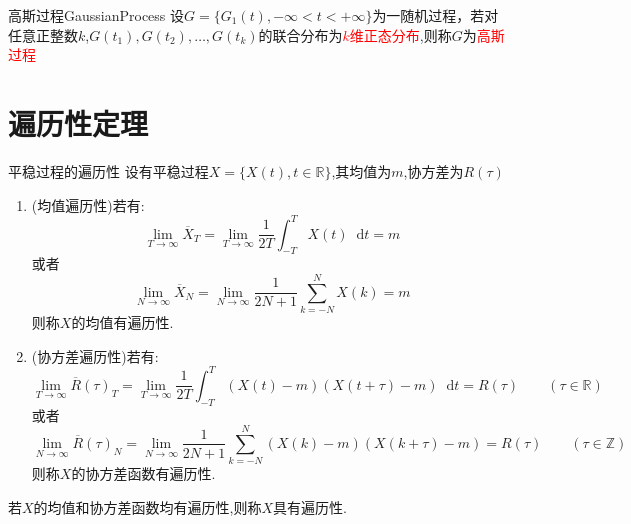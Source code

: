 \documentclass{elegantbook}
\renewcommand\d{\mathop{}\!\mathrm{d}}
\newcommand{\red}{\color{red}}
\begin{document}
\begin{definition}{高斯过程}{GaussianProcess}
    设$G=\{G_1(t),-\infty <t<+\infty\}$为一随机过程，若对任意正整数$k$,$G(t_1),G(t_2),\dots ,G(t_k)$的联合分布为\textcolor{red}{$k$维正态分布},则称$G$为\textcolor{red}{高斯过程}
\end{definition}

\section{遍历性定理}
\begin{definition}{平稳过程的遍历性}{}
	设有平稳过程$X=\{X(t),t\in \mathbb{R}\}$,其均值为$m$,协方差为$R(\tau)$
	\begin{enumerate}[label=(\alph*)]
		\item ({\red 均值遍历性})若有:
					\begin{equation}
          	\lim_{T \to \infty}\overline{X}_T=\lim_{T \to \infty}\frac{1}{2T}\int_{-T}^{T}X(t)\d t = m\label{mean-ergodic}
					\end{equation}
					或者\[\lim_{N \to \infty}\overline{X}_N=\lim_{N \to \infty}\frac{1}{2N+1}\sum_{k=-N}^{N}X(k) = m\]
					则称$X$的均值有遍历性.
		\item ({\red 协方差遍历性})若有:\[\lim_{T \to \infty}\overline{R}(\tau)_T = \lim_{T \to \infty}\frac{1}{2T}\int_{-T}^{T}(X(t)-m)(X(t+\tau)-m)\d t = R(\tau)\qquad (\tau \in \mathbb{R})\]
					或者\[\lim_{N \to \infty}\overline{R}(\tau)_N = \lim_{N \to \infty}\frac{1}{2N+1}\sum_{k=-N}^{N}(X(k)-m)(X(k+\tau)-m) = R(\tau)\qquad (\tau \in \mathbb{Z})\]
					则称$X$的协方差函数有遍历性.
	\end{enumerate}
	若$X$的均值和协方差函数{\red 均有}遍历性,则称$X$具有{\red 遍历性}.
\end{definition}
\end{document}
